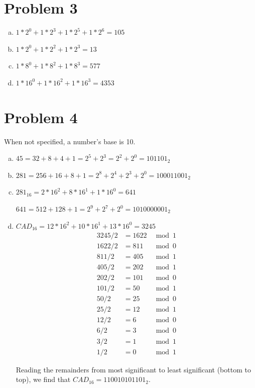 \section*{Problem 3}
	\begin{enumerate}[(a)]
		\item $ 1* 2^0 + 1 * 2^ 3 + 1* 2^5 + 1* 2^6 =105$
		\item $ 1* 2^0 + 1 * 2^2 + 1 * 2^3 = 13$
		\item $1* 8^ 0 + 1* 8 ^ 2 + 1 * 8^3 =577$
		\item $ 1* 16^0 + 1* 16^ 2 + 1* 16^ 3 = 4353$
		
	\end{enumerate}

\section*{Problem 4}
When not specified, a number's base is 10.

	\begin{enumerate}[(a)]
		\item $45 = 32 + 8 + 4 + 1 = 2^5 + 2^ 3 = 2^2 + 2^0 = 101101_2$
		\item $281= 256 + 16 + 8 + 1 = 2^8 + 2 ^ 4 + 2^ 3 + 2 ^0 = 100011001_2$
		\item $281_{16} = 2*16^2 + 8*16^1 + 1 * 16^0 = 641$
		
				$641 = 512 + 128 + 1 = 2^9 + 2^7 + 2^0 = 1010000001_2$

		\item  $CAD_{16} = 12* 16^2 + 10 * 16^1 + 13* 16^0 = 3245$
					\begin{align*}
					3245 / 2 &= 1622 &\bmod 1\\
					1622 /2 &= 811 &\bmod 0\\
					811 /2 &= 405 &\bmod 1\\
					405 /2 &= 202 &\bmod 1\\
					202 /2 &= 101 &\bmod 0\\
					101 /2 &= 50 &\bmod 1\\
					50 /2 &= 25 &\bmod 0\\
					25/2 &= 12 &\bmod 1\\
					12/2 &= 6 &\bmod 0\\
					6/2 &= 3 &\bmod 0\\
					3/2 &= 1 &\bmod 1\\
					1/2 &= 0 &\bmod 1
					\end{align*}
					
				Reading the remainders from most significant to least significant (bottom to top), we find that $CAD_{16} = 110010101101_2$.

		
	\end{enumerate}

